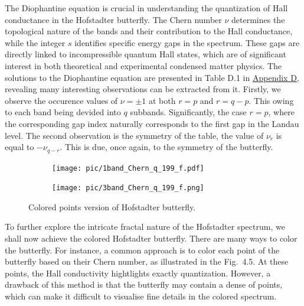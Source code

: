 The Diophantine equation is crucial in understanding the quantization of Hall conductance in the Hofstadter butterfly. The Chern number $\nu$ determines the topological nature of the bands and their contribution to the Hall conductance, while the integer $s$ identifies specific energy gaps in the spectrum. These gaps are directly linked to incompressible quantum Hall states, which are of significant interest in both theoretical and experimental condensed matter physics. The solutions to the Diophantine equation are presented in Table D.1 in \hyperref[appendix D]{Appendix D}, revealing many interesting observations can be extracted from it. Firstly, we observe the occurence values of $\nu = \pm 1$ at both $r = p$ and $r = q-p$. This owing to each band being devided into $q$ subbands. Significantly, the case $r = p$, where the corresponding gap index naturally corresponds to the first gap in the Landau level. The second observation is the symmetry of the table, the value of $\nu_{r}$ is equal to $-\nu_{q-r}$. This is due, once again, to the symmetry of the butterfly.
\begin{figure}[htb]
	\centering
	\begin{subfigure}[b]{0.495\textwidth}
		\centering
		{\texttt{[image: pic/1band\_Chern\_q\_199\_f.pdf]}}
	\end{subfigure}
	\begin{subfigure}[b]{0.495\textwidth}
		\centering
		\texttt{[image: pic/3band\_Chern\_q\_199\_f.png]}
	\end{subfigure}
	\caption{
		Colored points version of Hofstadter butterfly.
	}
\end{figure}

To further explore the intricate fractal nature of the Hofstadter spectrum, we shall now achieve the colored Hofstadter butterfly. There are many ways to color the butterfly. For instance, a common approach is to color each point of the butterfly based on their Chern number, as illustrated in the Fig.~4.5. At these points, the Hall conductivity hightlights exactly quantization. However, a drawback of this method is that the butterfly may contain a dense of points, which can make it difficult to visualise fine details in the colored spectrum.




